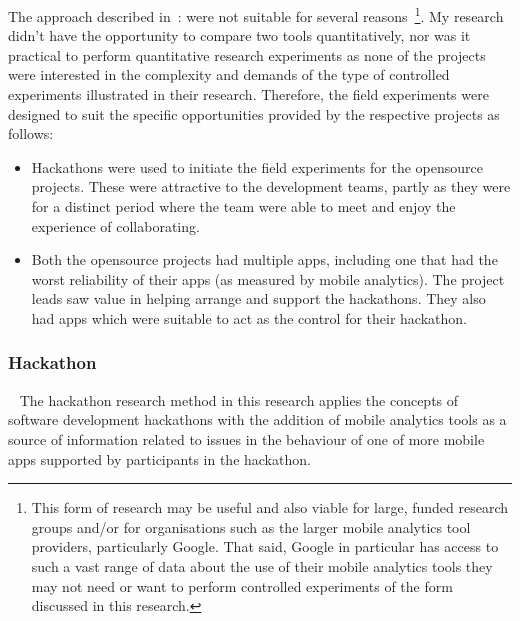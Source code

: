 The approach described in~\citep{Ko2015_a_practical_guide_to_controlled_experiments_of_sw_eng_tools_with_human_participants}: were not suitable for several reasons~\footnote{This form of research may be useful and also viable for large, funded research groups and/or for organisations such as the larger mobile analytics tool providers, particularly Google. That said, Google in particular has access to such a vast range of data about the use of their mobile analytics tools they may not need or want to perform controlled experiments of the form discussed in this research.}. 
%
My research didn't have the opportunity to compare two tools quantitatively, nor was it practical to perform quantitative research experiments as none of the projects were interested in the complexity and demands of the type of controlled experiments illustrated in their research. Therefore, the field experiments were designed to suit the specific opportunities provided by the respective projects as follows:
\begin{itemize}
    \item Hackathons were used to initiate the field experiments for the opensource projects. These were attractive to the development teams, partly as they were for a distinct period where the team were able to meet and enjoy the experience of collaborating.
    \item Both the opensource projects had multiple apps, including one that had the worst reliability of their apps (as measured by mobile analytics). The project leads saw value in helping arrange and support the hackathons. They also had apps which were suitable to act as the control for their hackathon. 
\end{itemize}


\subsubsection{Hackathon}~\label{section-hackathon-research-method}
The hackathon research method in this research applies the concepts of software development hackathons with the addition of mobile analytics tools as a source of information related to issues in the behaviour of one of more mobile apps supported by participants in the hackathon.

